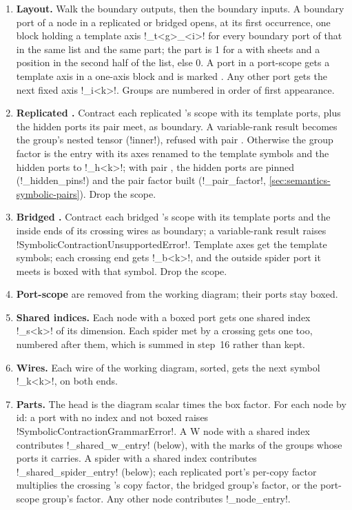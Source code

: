 \begin{algorithm}
\begin{enumerate}
\item \textbf{Layout.} Walk the boundary outputs, then the boundary inputs. A boundary port of a node in a replicated or bridged \bbox{} opens, at its first occurrence, one block holding a template axis \code!_t<g>_<i>! for every boundary port of that \bbox{} in the same list and the same part; the part is 1 for a \bbox{} with sheets and a position in the second half of the list, else 0. A port in a port-scope \bbox{} gets a template axis in a one-axis block and is marked . Any other port gets the next fixed axis \code!_i<k>!. Groups are numbered in order of first appearance.
\item \textbf{Replicated \bboxes{}.} Contract each replicated \bbox{}'s scope with its template ports, plus the hidden ports its pair \bboxes{} meet, as boundary. A variable-rank result becomes the group's nested tensor (\py!inner!), refused with pair \bboxes{}. Otherwise the group factor is the entry with its axes renamed to the template symbols and the hidden ports to \code!_h<k>!; with pair \bboxes{}, the hidden ports are pinned (\py!_hidden_pins!) and the pair factor built (\py!_pair_factor!, \cref{sec:semantics-symbolic-pairs}). Drop the scope.
\item \textbf{Bridged \bboxes{}.} Contract each bridged \bbox{}'s scope with its template ports and the inside ends of its crossing wires as boundary; a variable-rank result raises \py!SymbolicContractionUnsupportedError!. Template axes get the template symbols; each crossing end gets \code!_b<k>!, and the outside spider port it meets is boxed with that symbol. Drop the scope.
\item \textbf{Port-scope \bboxes{}} are removed from the working diagram; their ports stay boxed.
\item \textbf{Shared indices.} Each node with a boxed port gets one shared index \code!_s<k>! of its dimension. Each spider met by a crossing \bbox{} gets one too, numbered after them, which is summed in step~16 rather than kept.
\item \textbf{Wires.} Each wire of the working diagram, sorted, gets the next symbol \code!_k<k>!, on both ends.
\item \textbf{Parts.} The head is the diagram scalar times the box factor. For each node by id: a port with no index and not boxed raises \py!SymbolicContractionGrammarError!. A W node with a shared index contributes \py!_shared_w_entry! (below), with the marks of the groups whose ports it carries. A spider with a shared index contributes \py!_shared_spider_entry! (below); each replicated port's per-copy factor multiplies the crossing \bbox{}'s copy factor, the bridged group's factor, or the port-scope group's factor. Any other node contributes \py!_node_entry!.

\end{enumerate}
\end{algorithm}
